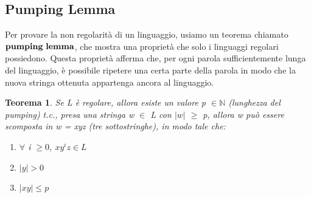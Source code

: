 \documentclass{article}
\newtheorem{theorem}{Teorema}[section]
\begin{document}
\subsection{Pumping Lemma}
Per provare la non regolarità di un linguaggio, usiamo un teorema chiamato $\bold{pumping \ lemma}$, che mostra una proprietà che solo i linguaggi regolari possiedono. \newline
Questa proprietà afferma che, per ogni parola sufficientemente lunga del linguaggio, è possibile ripetere una certa parte della parola in modo che la nuova stringa ottenuta appartenga ancora al linguaggio.
\begin{theorem}
Se L è regolare, allora esiste un valore p $\in \mathbb{N}$ (lunghezza del pumping) t.c., presa una stringa w $\in$ L con $|w|$ $\geq$ p, allora w può essere scomposta in w = xyz (tre sottostringhe), in modo tale che:
\begin{enumerate}
    \renewcommand{\labelenumi}{\roman{enumi})}
    \item $\forall$ i $\geq 0$, $xy^iz \in L$
    \item $|y| > 0$
    \item $|xy| \leq p$
\end{enumerate}
\begin{center} 
\end{center}
\end{theorem}
\end{document}
